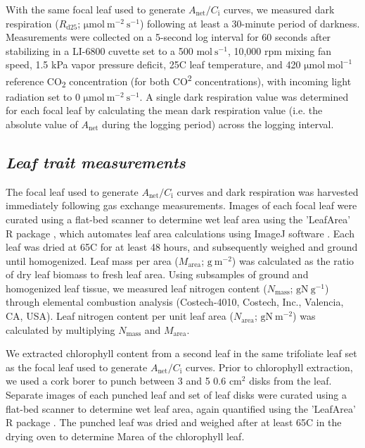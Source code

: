     With the same focal leaf used to generate $A_\mathrm{{net}}/C_\mathrm{i}$ curves, we measured dark respiration ($R_\mathrm{{d25}}$; $\mathrm{\mu mol\ m^{-2}\ s^{-1}}$) following at least a 30-minute period of darkness. Measurements were collected on a 5-second log interval for 60 seconds after stabilizing in a LI-6800 cuvette set to a 500 $\mathrm{mol\ s^{-1}}$, 10,000 rpm mixing fan speed, 1.5 kPa vapor pressure deficit, 25\textdegree{}C leaf temperature, and 420 $\mathrm{\mu mol\ mol^{-1}}$ reference CO\textsubscript{2} concentration (for both CO\textsuperscript{2} concentrations), with incoming light radiation set to 0 $\mathrm{\mu mol\ m^{-2}\ s^{-1}}$. A single dark respiration value was determined for each focal leaf by calculating the mean dark respiration value (i.e. the absolute value of $A_\mathrm{{net}}$ during the logging period) across the logging interval.

    \subsection{\textit{Leaf trait measurements}}

    The focal leaf used to generate $A_\mathrm{{net}}/C_\mathrm{i}$ curves and dark respiration was harvested immediately following gas exchange measurements. Images of each focal leaf were curated using a flat-bed scanner to determine wet leaf area using the 'LeafArea' R package , which automates leaf area calculations using ImageJ software . Each leaf was dried at 65\textdegree{}C for at least 48 hours, and subsequently weighed and ground until homogenized. Leaf mass per area ($M_\mathrm{area}$; $\mathrm{g\ m^{-2}}$) was calculated as the ratio of dry leaf biomass to fresh leaf area. Using subsamples of ground and homogenized leaf tissue, we measured leaf nitrogen content ($N_\mathrm{mass}$; $\mathrm{g N\ g^{-1}}$) through elemental combustion analysis (Costech-4010, Costech, Inc., Valencia, CA, USA). Leaf nitrogen content per unit leaf area ($N_\mathrm{area}$; $\mathrm{g N\ m^{-2}}$) was calculated by multiplying $N_\mathrm{mass}$ and $M_\mathrm{area}$.

    We extracted chlorophyll content from a second leaf in the same trifoliate leaf set as the focal leaf used to generate $A_\mathrm{{net}}/C_\mathrm{i}$ curves. Prior to chlorophyll extraction, we used a cork borer to punch between 3 and 5 0.6 $\mathrm{cm^{2}}$ disks from the leaf. Separate images of each punched leaf and set of leaf disks were curated using a flat-bed scanner to determine wet leaf area, again quantified using the 'LeafArea' R package . The punched leaf was dried and weighed after at least 65\textdegree{}C in the drying oven to determine Marea of the chlorophyll leaf.
    

